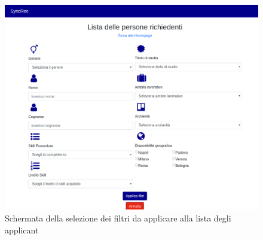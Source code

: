 \vspace{0.5em}
\begin{figure}[!h] 
	\centering 
	\includegraphics[width=1\columnwidth]{immagini/svil/filtri} 
	\caption{Schermata della selezione dei filtri da applicare alla lista degli applicant}
	\label{figura:filtri}
\end{figure}

